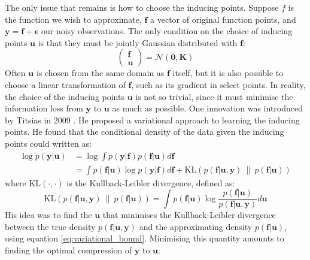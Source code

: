\documentclass[a4paper,12pt]{article}
\begin{document}
The only issue that remains is how to choose the inducing points. Suppose $f$ is the function we wish to approximate, $\mathbf{f}$ a vector of original function points, and $\mathbf{y} = \mathbf{f} + \boldsymbol{\epsilon}$ our noisy observations. The only condition on the choice of inducing points $\mathbf{u}$ is that they must be jointly Gaussian distributed with $\mathbf{f}$:
\begin{equation}
    \begin{pmatrix}
        \mathbf{f}\\
        \mathbf{u}
    \end{pmatrix} = \mathcal{N}(\mathbf{0}, \mathbf{K})
\end{equation}
Often $\mathbf{u}$ is chosen from the same domain as $\mathbf{f}$ itself, but it is also possible to choose a linear transformation of $\mathbf{f}$, such as its gradient in select points. In reality, the choice of the inducing points $\mathbf{u}$ is not so trivial, since it must minimise the information loss from $\mathbf{y}$ to $\mathbf{u}$ as much as possible. One innovation was introduced by Titsias in 2009 \cite{Titsias09}. He proposed a variational approach to learning the inducing points. He found that the conditional density of the data given the inducing points could written as:
\begin{equation}
\label{eq:variational_bound}
\begin{aligned}
    \log{p(\mathbf{y} | \mathbf{u})} &= \log{\int p(\mathbf{y} | \mathbf{f}) p(\mathbf{f} | \mathbf{u}) d\mathbf{f}}\\
        &= \int p(\mathbf{f} | \mathbf{u}) \log{p(\mathbf{y} | \mathbf{f})} d\mathbf{f} + \text{KL}(p(\mathbf{f}|\mathbf{u}, \mathbf{y})\ \| \ p(\mathbf{f}|\mathbf{u}))
\end{aligned}
\end{equation}
where KL$(\cdot, \cdot)$ is the Kullback-Leibler divergence, defined as:
\begin{equation}
    \text{KL}(p(\mathbf{f}|\mathbf{u}, \mathbf{y})\ \| \ p(\mathbf{f}|\mathbf{u})) = \int p(\mathbf{f}|\mathbf{u}) \log{\frac{p(\mathbf{f}|\mathbf{u})}{p(\mathbf{f}|\mathbf{u}, \mathbf{y})}} d\mathbf{u}
\end{equation}
His idea was to find the $\mathbf{u}$ that minimises the Kullback-Leibler divergence between the true density $p(\mathbf{f}|\mathbf{u}, \mathbf{y})$ and the approximating density $p(\mathbf{f}|\mathbf{u})$, using equation \ref{eq:variational_bound}. Minimising this quantity amounts to finding the optimal compression of $\mathbf{y}$ to $\mathbf{u}$.
\end{document}
